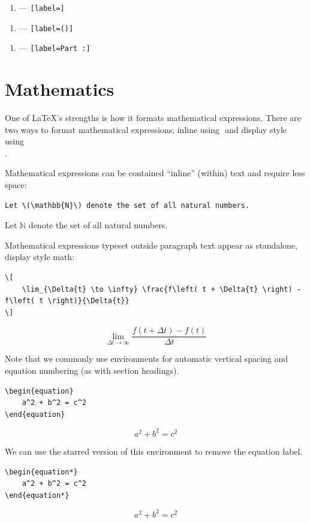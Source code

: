 \documentclass[11pt, twoside]{article}
\begin{document}
\begin{enumerate}[label=\roman*]
    \item --- \texttt{[label=\roman*]}
\end{enumerate}
\begin{enumerate}[label=(\alph*)]
    \item --- \texttt{[label=(\alph*)]}
\end{enumerate}
\begin{enumerate}[label=Part \Alph*:]
    \item --- \texttt{[label=Part \Alph*:]}
\end{enumerate}
\newpage
\section{Mathematics}
One of \LaTeX{}'s strengths is how it formats mathematical expressions.
There are two ways to format mathematical expressions; inline using \texttt{\( \)} and display style using \texttt{\[ \]}.

Mathematical expressions can be contained ``inline'' (within) text and require less space:
\begin{verbatim}
Let \(\mathbb{N}\) denote the set of all natural numbers.
\end{verbatim}
\begin{outputbox}
    Let \(\mathbb{N}\) denote the set of all natural numbers.
\end{outputbox}
Mathematical expressions typeset outside paragraph text appear as standalone, display style math:
\begin{verbatim}
\[
    \lim_{\Delta{t} \to \infty} \frac{f\left( t + \Delta{t} \right) - f\left( t \right)}{\Delta{t}}
\]
\end{verbatim}
\begin{outputbox}
    \[
        \lim_{\Delta{t} \to \infty} \frac{f\left( t + \Delta{t} \right) - f\left( t \right)}{\Delta{t}}
    \]
\end{outputbox}
Note that we commonly use \texttt{\equation} environments for automatic vertical spacing and equation numbering
(as with section headings).
\begin{verbatim}
\begin{equation}
    a^2 + b^2 = c^2
\end{equation}
\end{verbatim}
\begin{outputbox}
    \begin{equation}
        a^2 + b^2 = c^2
    \end{equation}
\end{outputbox}
We can use the starred version of this environment to remove the equation label.
\begin{verbatim}
\begin{equation*}
    a^2 + b^2 = c^2
\end{equation*}
\end{verbatim}
\begin{outputbox}
    \begin{equation*}
        a^2 + b^2 = c^2
    \end{equation*}
\end{outputbox}
\end{document}
